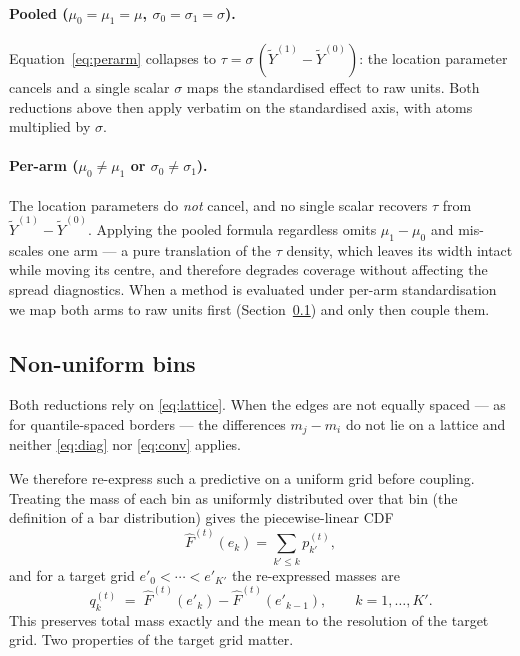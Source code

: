 \paragraph{Pooled ($\mu_0=\mu_1=\mu$, $\sigma_0=\sigma_1=\sigma$).}
Equation~\eqref{eq:perarm} collapses to
$\tau = \sigma\,(\widetilde{Y}^{(1)} - \widetilde{Y}^{(0)})$: the location
parameter cancels and a single scalar $\sigma$ maps the standardised effect
to raw units. Both reductions above then apply verbatim on the standardised
axis, with atoms multiplied by $\sigma$.

\paragraph{Per-arm ($\mu_0 \neq \mu_1$ or $\sigma_0 \neq \sigma_1$).}
The location parameters do \emph{not} cancel, and no single scalar recovers
$\tau$ from $\widetilde{Y}^{(1)} - \widetilde{Y}^{(0)}$. Applying the pooled
formula regardless omits $\mu_1 - \mu_0$ and mis-scales one arm --- a pure
translation of the $\tau$ density, which leaves its width intact while moving
its centre, and therefore degrades coverage without affecting the spread
diagnostics. When a method is evaluated under per-arm standardisation we map
both arms to raw units first (Section~\ref{app:nonuniform}) and only then
couple them.

\subsection{Non-uniform bins}
\label{app:nonuniform}

Both reductions rely on \eqref{eq:lattice}. When the edges are not equally
spaced --- as for quantile-spaced borders --- the differences $m_j - m_i$ do
not lie on a lattice and neither \eqref{eq:diag} nor \eqref{eq:conv} applies.

We therefore re-express such a predictive on a uniform grid before coupling.
Treating the mass of each bin as uniformly distributed over that bin (the
definition of a bar distribution) gives the piecewise-linear CDF
\begin{equation}
  \hat F^{(t)}(e_k) = \sum_{k' \le k} p^{(t)}_{k'} ,
\end{equation}
and for a target grid $e'_0 < \cdots < e'_{K'}$ the re-expressed masses are
\begin{equation}
  \boxed{\;
  q^{(t)}_{k} \;=\; \hat F^{(t)}(e'_{k}) - \hat F^{(t)}(e'_{k-1}) ,
  \qquad k = 1,\dots,K' .
  \;}
  \label{eq:rebin}
\end{equation}
This preserves total mass exactly and the mean to the resolution of the
target grid. Two properties of the target grid matter.

